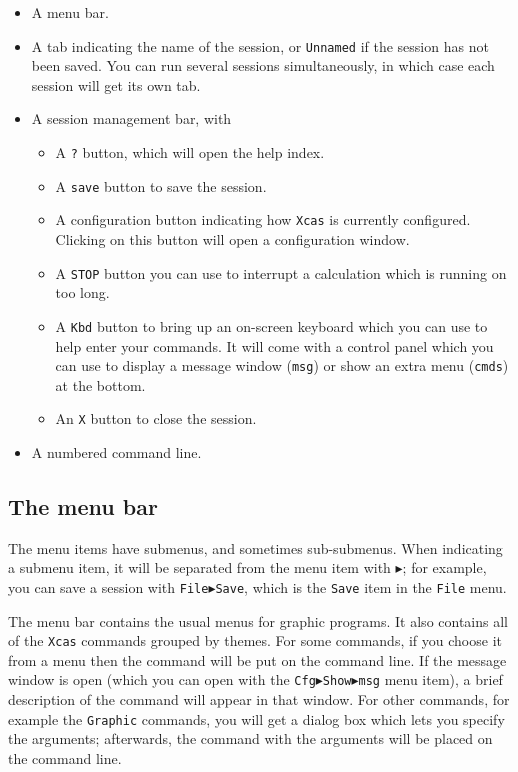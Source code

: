 \documentclass{article}
\begin{document}
\begin{itemize}
  \item
  A menu bar.
  \item
  A tab indicating the name of the session, or \texttt{Unnamed} if the
  session has not been saved.  You can run several sessions
  simultaneously, in which case each session will get its own tab.
  \item
  A session management bar, with
  \begin{itemize}
    \item
    A \texttt{?} button, which will open the help index.
    \item
    A \texttt{save} button to save the session.
    \item
    A configuration button indicating how \texttt{Xcas} is currently
    configured.  Clicking on this button will open a configuration
    window.
    \item
    A \texttt{STOP} button you can use to interrupt a calculation
    which is running on too long.
    \item
    A \texttt{Kbd} button to bring up an on-screen keyboard which you
    can use to help enter your commands.  It will come with a control panel
    which you can use to display a message window (\texttt{msg}) or
    show an extra menu (\texttt{cmds}) at the bottom.
    \item
    An \texttt{X} button to close the session.
  \end{itemize}
  \item
  A numbered command line.
\end{itemize}

\subsection{The menu bar}
The menu items have submenus, and sometimes sub-submenus. When
indicating a submenu item, it will be separated from the menu item with
$\blacktriangleright$; for example, you can save a session with
\texttt{File$\blacktriangleright$Save}, which is the \texttt{Save}
item in the \texttt{File} menu.

The menu bar contains the usual menus for graphic programs.  It also
contains all of the \texttt{Xcas} commands grouped by themes.  For
some commands, if you choose it from a menu then the command will be
put on the command line.  If the message window is open (which you can
open with the
\texttt{Cfg$\blacktriangleright$Show$\blacktriangleright$msg}
menu item), a brief description of the command will appear in that
window.  For other commands, for example the \texttt{Graphic}
commands, you will get a dialog box which lets you specify the
arguments; afterwards, the command with the arguments will be placed
on the command line.
\end{document}
